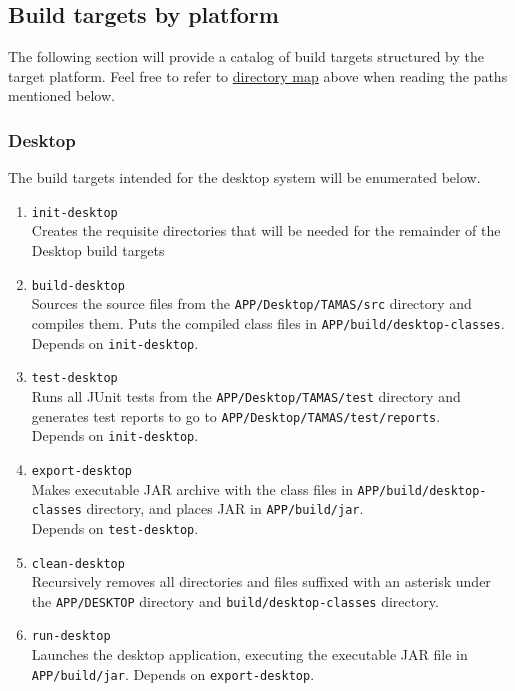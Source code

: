 \documentclass[12pt]{report}
\begin{document}
\subsection{Build targets by platform}
\label{s:build-targets}
The following section will provide a catalog of build targets structured by the target platform.
Feel free to refer to \hyperref[s:build-dirtree]{directory map} above when reading the paths
mentioned below.
\subsubsection{Desktop}
The build targets intended for the desktop system will be enumerated below. 
\begin{enumerate}
	\item \texttt{init-desktop}\\
		Creates the requisite directories that will be needed for the remainder of the Desktop build
		targets
	\item \texttt{build-desktop}\\
		Sources the source files from the \texttt{APP/Desktop/TAMAS/src} directory and compiles
		them. Puts the compiled class files in \texttt{APP/build/desktop-classes}.\\
		Depends on \texttt{init-desktop}.
	\item \texttt{test-desktop}\\
		Runs all JUnit tests from the \texttt{APP/Desktop/TAMAS/test} directory and generates test
		reports to go to \texttt{APP/Desktop/TAMAS/test/reports}.\\
		Depends on \texttt{init-desktop}.
	\item \texttt{export-desktop}\\
		Makes executable JAR archive with the class files in \texttt{APP/build/desktop-classes}
		directory, and places JAR in \texttt{APP/build/jar}.\\
		Depends on \texttt{test-desktop}.
	\item \texttt{clean-desktop}\\
		Recursively removes all directories and files suffixed with an asterisk under the
		\texttt{APP/DESKTOP} directory and \texttt{build/desktop-classes} directory.
	\item \texttt{run-desktop}\\
		Launches the desktop application, executing the executable JAR file in
		\texttt{APP/build/jar}.
		Depends on \texttt{export-desktop}.
\end{enumerate}
\end{document}
